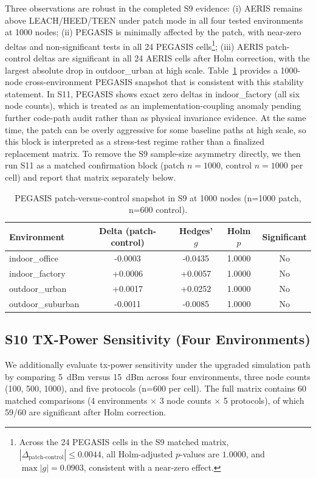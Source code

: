 \documentclass[sensors,article,submit,moreauthors,pdftex]{Definitions/mdpi}
\begin{document}
Three observations are robust in the completed S9 evidence: (i) AERIS remains above LEACH/HEED/TEEN under patch mode in all four tested environments at 1000 nodes; (ii) PEGASIS is minimally affected by the patch, with near-zero deltas and non-significant tests in all 24 PEGASIS cells\footnote{Across the 24 PEGASIS cells in the S9 matched matrix, \(|\Delta_{\text{patch-control}}| \le 0.0044\), all Holm-adjusted \(p\)-values are \(1.0000\), and \(\max |g| = 0.0903\), consistent with a near-zero effect.}; (iii) AERIS patch-control deltas are significant in all 24 AERIS cells after Holm correction, with the largest absolute drop in outdoor\_urban at high scale. Table~\ref{tab:s9_pegasis_1000} provides a 1000-node cross-environment PEGASIS snapshot that is consistent with this stability statement. In S11, PEGASIS shows exact zero deltas in indoor\_factory (all six node counts), which is treated as an implementation-coupling anomaly pending further code-path audit rather than as physical invariance evidence. At the same time, the patch can be overly aggressive for some baseline paths at high scale, so this block is interpreted as a stress-test regime rather than a finalized replacement matrix. To remove the S9 sample-size asymmetry directly, we then run S11 as a matched confirmation block (patch \(n=1000\), control \(n=1000\) per cell) and report that matrix separately below.

\begin{table}[H]
\caption{PEGASIS patch-versus-control snapshot in S9 at 1000 nodes (n=1000 patch, n=600 control).}
\label{tab:s9_pegasis_1000}
\centering
\begin{tabular}{lcccc}
\toprule
Environment & Delta (patch-control) & Hedges' $g$ & Holm $p$ & Significant \\
\midrule
indoor\_office    & -0.0003 & -0.0435 & 1.0000 & No \\
indoor\_factory   & +0.0006 & +0.0057 & 1.0000 & No \\
outdoor\_urban    & +0.0017 & +0.0252 & 1.0000 & No \\
outdoor\_suburban & -0.0011 & -0.0085 & 1.0000 & No \\
\bottomrule
\end{tabular}
\end{table}

\subsection{S10 TX-Power Sensitivity (Four Environments)}
We additionally evaluate tx-power sensitivity under the upgraded simulation path by comparing \SI{5}{dBm} versus \SI{15}{dBm} across four environments, three node counts (100, 500, 1000), and five protocols (n=600 per cell). The full matrix contains 60 matched comparisons (4 environments $\times$ 3 node counts $\times$ 5 protocols), of which 59/60 are significant after Holm correction.
\end{document}

